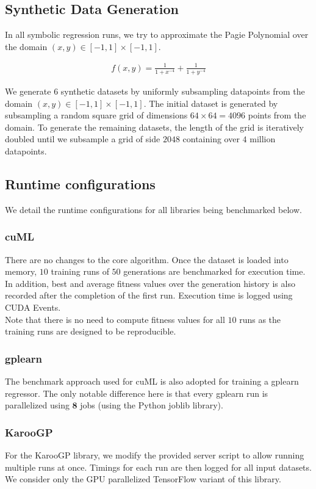 \subsection{Synthetic Data Generation}
\label{subsec:datagen}
In all symbolic regression runs, we try to approximate the Pagie Polynomial\citep{Pagie1997} over the domain $(x,y) \in [-1,1] \times [-1,1]$.

\begin{align}
  f(x,y) = \frac{1}{1 + x^{-4}} + \frac{1}{1 + y^{-4}}
\end{align}

We generate $6$ synthetic datasets by uniformly subsampling datapoints from the domain $(x,y) \in [-1,1] \times [-1,1]$. The initial dataset is generated by subsampling a random square grid of dimensions $64 \times 64 = 4096$ points from the domain. To generate the remaining datasets, the length of the grid is iteratively doubled until we subsample a grid of side $2048$ containing over $4$ million datapoints.

\subsection{Runtime configurations}
\label{subsec:rtconfig}
We detail the runtime configurations for all libraries being benchmarked below. 
\subsubsection{cuML} 
There are no changes to the core algorithm. Once the dataset is loaded into memory, $10$ training runs of $50$ generations are benchmarked for execution time. In addition, best and average fitness values over the generation history is also recorded after the completion of the first run. Execution time is logged using CUDA Events.\\
Note that there is no need to compute fitness values for all $10$ runs as the training runs are designed to be reproducible. 

\subsubsection{gplearn}
The benchmark approach used for cuML is also adopted for training a gplearn regressor. The only notable difference here is that every gplearn run is parallelized using $\mathbf{8}$ jobs (using the Python joblib library).

\subsubsection{KarooGP}
For the KarooGP library, we modify the provided server script to allow running multiple runs at once. Timings for each run are then logged for all input datasets. We consider only the GPU parallelized TensorFlow variant of this library.   

